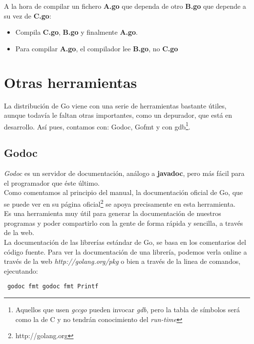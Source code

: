 	A la hora de compilar un fichero \textbf{A.go} que dependa de otro
	\textbf{B.go} que depende a su vez de \textbf{C.go}:
	
	\begin{itemize} \renewcommand{\labelitemi}{-} \item Compila \textbf{C.go},
	\textbf{B.go} y finalmente \textbf{A.go}.  \item Para compilar
	\textbf{A.go}, el compilador lee \textbf{B.go}, no \textbf{C.go}
	\end{itemize}

\section{Otras herramientas}

La distribución de Go viene con una serie de herramientas bastante útiles,
aunque todavía le faltan otras importantes, como un depurador, que está en
desarrollo. Así pues, contamos con: Godoc, Gofmt y con gdb\footnote{Aquellos que
usen \emph{gccgo} pueden invocar \textit{gdb}, pero la tabla de símbolos será
como la de C y no tendrán conocimiento del \emph{run-time}}.

	\subsection{Godoc}
	
	\emph{Godoc} es un servidor de documentación, análogo a \textbf{javadoc},
	pero más fácil para el programador que éste último.\\
	
	Como comentamos al principio del manual, la documentación oficial de Go, que
	se puede ver en su página oficial\footnote{http://golang.org} se apoya
	precisamente en esta herramienta.\\
	
	Es una herramienta muy útil para generar la documentación de nuestros
	programas y poder compartirlo con la gente de forma rápida y sencilla,
	a través de la web.\\
	
	La documentación de las librerías estándar de Go, se basa en los comentarios
	del código fuente. Para ver la documentación de una librería, podemos verla
	online a través de la web \emph{http://golang.org/pkg} o bien a través de
	la linea de comandos, ejecutando:
	
	\begin{verbatim} godoc fmt godoc fmt Printf \end{verbatim}
	

